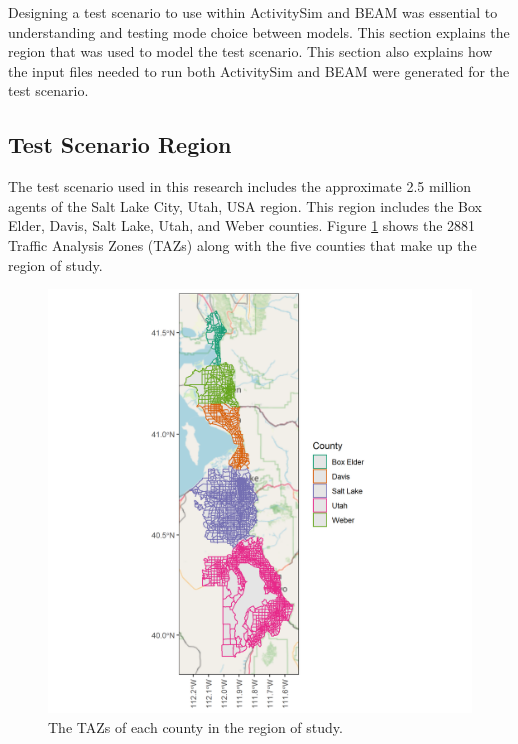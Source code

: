 \documentclass[12pt, oneside, openright]{byuthesis}
\begin{document}
Designing a test scenario to use within ActivitySim and BEAM was essential to understanding and testing mode choice between models. This section explains the region that was used to model the test scenario. This section also explains how the input files needed to run both ActivitySim and BEAM were generated for the test scenario.

\hypertarget{test-scenario-region}{%
\subsection{Test Scenario Region}\label{test-scenario-region}}

The test scenario used in this research includes the approximate 2.5 million agents of the Salt Lake City, Utah, USA region. This region includes the Box Elder, Davis, Salt Lake, Utah, and Weber counties. Figure \ref{fig:figregion} shows the 2881 Traffic Analysis Zones (TAZs) along with the five counties that make up the region of study.

\begin{figure}

{\centering \includegraphics[width=480px]{pics/taz} 

}

\caption{The TAZs of each county in the region of study.}\label{fig:figregion}
\end{figure}
\end{document}
